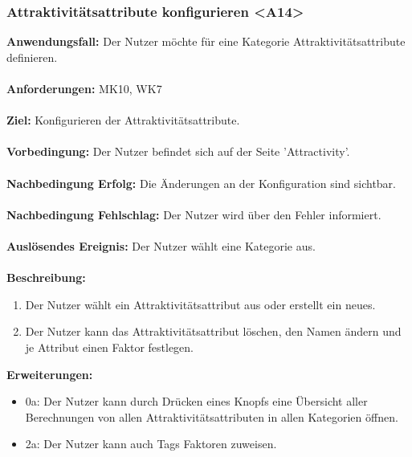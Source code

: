 \documentclass[parskip=full]{scrartcl} %
\begin{document}
\subsubsection*{Attraktivitätsattribute konfigurieren <A14>}
\textbf{Anwendungsfall:} Der Nutzer möchte für eine Kategorie Attraktivitätsattribute definieren.\\\\
\textbf{Anforderungen:} MK10, WK7\\\\
\textbf{Ziel:} Konfigurieren der Attraktivitätsattribute. \\\\
\textbf{Vorbedingung:} Der Nutzer befindet sich auf der Seite 'Attractivity'. \\\\
\textbf{Nachbedingung Erfolg:} Die Änderungen an der Konfiguration sind sichtbar. \\\\
\textbf{Nachbedingung Fehlschlag:} Der Nutzer wird über den Fehler informiert. \\\\
\textbf{Auslösendes Ereignis:} Der Nutzer wählt eine Kategorie aus. \\\\
\textbf{Beschreibung:}
\begin{enumerate}
    \item Der Nutzer wählt ein Attraktivitätsattribut aus oder erstellt ein neues.
    \item Der Nutzer kann das Attraktivitätsattribut löschen, den Namen ändern und je Attribut einen Faktor festlegen.
\end{enumerate}
\textbf{Erweiterungen:} 
\begin{itemize}
    \item 0a: Der Nutzer kann durch Drücken eines Knopfs eine Übersicht aller Berechnungen von allen Attraktivitätsattributen in allen Kategorien öffnen. 
    \item 2a: Der Nutzer kann auch Tags Faktoren zuweisen.
\end{itemize}
\newpage
\end{document}
